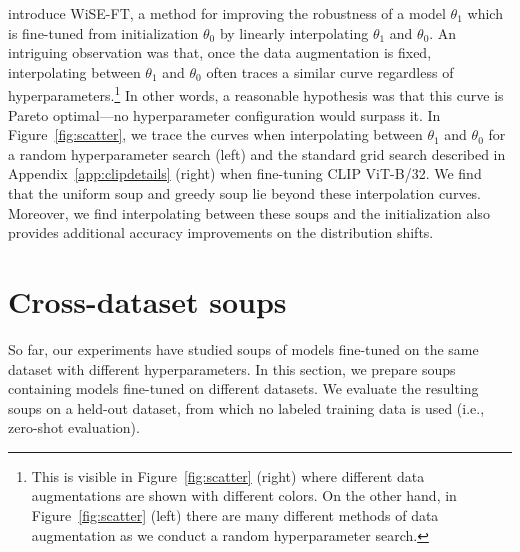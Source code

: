 \documentclass[nohyperref]{article}
\theoremstyle{plain}
\theoremstyle{definition}
\theoremstyle{remark}
\begin{document}
    \citet{wortsman2021robust} introduce WiSE-FT, a method for improving the
    robustness of a model $\theta_1$ which is fine-tuned from initialization $\theta_0$ by linearly interpolating $\theta_1$ and $\theta_0$. 
    An intriguing observation was that, once the data augmentation is fixed, 
    interpolating between $\theta_1$ and $\theta_0$
    often traces a similar curve regardless of hyperparameters.\footnote{
    This is visible in Figure~\ref{fig:scatter} (right) where different data augmentations
    are shown with different colors. On the other hand, in Figure~\ref{fig:scatter} (left) there are many different methods
    of data augmentation as we conduct a random hyperparameter search.}
    In other words, a reasonable hypothesis was that this
    curve is Pareto optimal---no hyperparameter configuration would surpass it.
    In Figure~\ref{fig:scatter}, we trace the curves when interpolating between
    $\theta_1$ and $\theta_0$ for a random hyperparameter search (left) and the
    standard grid search described in Appendix~\ref{app:clipdetails} (right) when fine-tuning CLIP ViT-B/32.
    We find that the uniform soup and greedy soup lie
    beyond these interpolation curves. Moreover, we find 
    interpolating between these
    soups and the initialization also provides additional accuracy improvements on the distribution shifts.
    


    \section{Cross-dataset soups}\label{sec:zsperf}
    So far, our experiments have studied soups of models fine-tuned on the same dataset with different hyperparameters.
    In this section, we prepare soups containing models fine-tuned on different datasets.
    We evaluate the resulting soups on a held-out dataset, from which no labeled training data is used (i.e., zero-shot evaluation).
    
\end{document}
